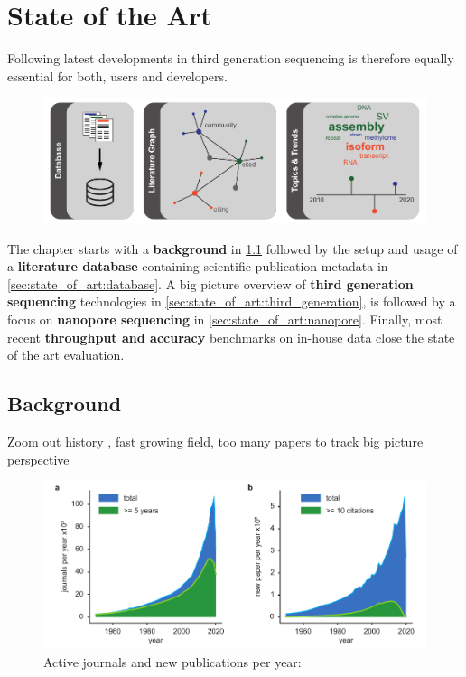 \chapter{State of the Art}
\label{cha:state_of_art}


Following latest developments in third generation sequencing is therefore equally essential for both, users and developers.

\begin{figure}[h]
	\centering
	\includegraphics[width=1.0\textwidth]{figures/state_of_art/GA.pdf}
	\label{fig:state_of_art:ga}
\end{figure}

The chapter starts with a \textbf{background} in \ref{sec:state_of_art:background} followed by the setup and usage of a \textbf{literature database} containing scientific publication metadata in \ref{sec:state_of_art:database}. A big picture overview of \textbf{third generation sequencing} technologies in \ref{sec:state_of_art:third_generation}, is followed by a focus on \textbf{nanopore sequencing} in \ref{sec:state_of_art:nanopore}. Finally, most recent \textbf{throughput and accuracy} benchmarks on in-house data close the state of the art evaluation.


\section{Background}
\label{sec:state_of_art:background}

Zoom out history \cite{Deamer2016}, fast growing field, too many papers to track big picture perspective

\begin{figure}[h]
	\centering
	\includegraphics[width=1.0\textwidth]{figures/state_of_art/paper_count.pdf}
	\captionsetup{format=plain}
	\caption[Journals and publications per year]{Active journals and new publications per year:}
	\label{fig:state_of_art:paper_count}
\end{figure}



